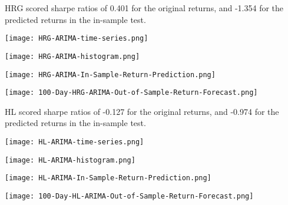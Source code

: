 HRG scored sharpe ratios of 0.401 for the original returns, and -1.354 for the predicted returns in the in-sample test.

\begin{center}
    \texttt{[image: HRG-ARIMA-time-series.png]}
    \label{fig:nonfloat}
\end{center}

\begin{center}
    \texttt{[image: HRG-ARIMA-histogram.png]}
    \label{fig:nonfloat}
\end{center}

\begin{center}
    \texttt{[image: HRG-ARIMA-In-Sample-Return-Prediction.png]}
    \label{fig:nonfloat}
\end{center}

\begin{center}
    \texttt{[image: 100-Day-HRG-ARIMA-Out-of-Sample-Return-Forecast.png]}
    \label{fig:nonfloat}
\end{center}

HL scored sharpe ratios of -0.127 for the original returns, and -0.974 for the predicted returns in the in-sample test.

\begin{center}
    \texttt{[image: HL-ARIMA-time-series.png]}
    \label{fig:nonfloat}
\end{center}

\begin{center}
    \texttt{[image: HL-ARIMA-histogram.png]}
    \label{fig:nonfloat}
\end{center}

\begin{center}
    \texttt{[image: HL-ARIMA-In-Sample-Return-Prediction.png]}
    \label{fig:nonfloat}
\end{center}

\begin{center}  
    \texttt{[image: 100-Day-HL-ARIMA-Out-of-Sample-Return-Forecast.png]}
    \label{fig:nonfloat}
\end{center}

